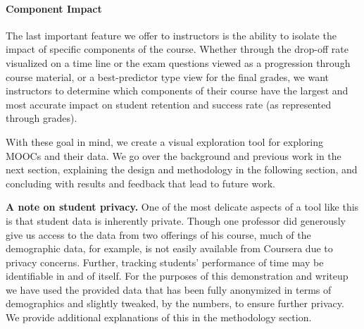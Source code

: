 \paragraph{Component Impact}
The last important feature we offer to instructors is the ability to isolate the impact of specific components of the course. Whether through the drop-off rate visualized on a time line or the exam questions viewed as a progression through course material, or a best-predictor type view for the final grades, we want instructors to determine which components of their course have the largest and most accurate impact on student retention and success rate (as represented through grades). 

With these goal in mind, we create a visual exploration tool for exploring MOOCs and their data. We 
go over the background and previous work in the next section, explaining the design and methodology
in the following section, and concluding with results and feedback that lead to future work. 

{\bf A note on student privacy. } One of the most delicate aspects of a tool like this is that student data is inherently private. Though one professor did generously give us access to the data from two offerings of his course, much of the demographic data, for example, is not easily available from Coursera due to privacy concerns. Further, tracking students' performance of time may be identifiable in and of itself. For the purposes of this demonstration and writeup we have used the provided data that has been fully anonymized in terms of demographics and slightly tweaked, by the numbers, to ensure further privacy. We provide additional explanations of this in the methodology section.
